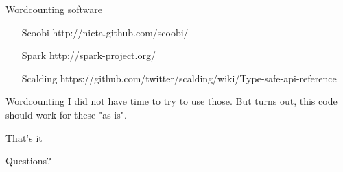 \documentclass{beamer}
\begin{document}
\begin{frame}{Wordcounting software}
\begin{enumerate}
  \item[Scoobi] http://nicta.github.com/scoobi/
  \item[Spark] http://spark-project.org/
  \item[Scalding] https://github.com/twitter/scalding/wiki/Type-safe-api-reference
\end{enumerate}
\end{frame}

\begin{frame}{Wordcounting}
  I did not have time to try to use those.
  But turns out, this code should work for these "as is".
\end{frame}

\begin{frame}{That's it}
  \Huge \centerline{Questions?}
\end{frame}
\end{document}
